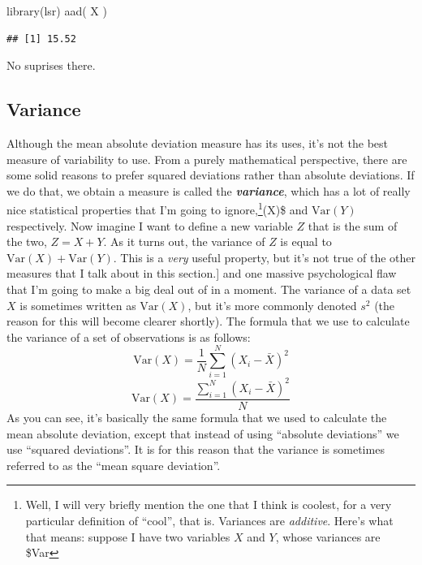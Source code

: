 \documentclass[
]{book}
\newenvironment{Shaded}{\begin{snugshade}}{\end{snugshade}}
\newcommand{\FunctionTok}[1]{\textcolor[rgb]{0.00,0.00,0.00}{#1}}
\newcommand{\NormalTok}[1]{#1}
\begin{document}
\begin{Shaded}
\begin{Highlighting}[]
\FunctionTok{library}\NormalTok{(lsr)}
\FunctionTok{aad}\NormalTok{( X )}
\end{Highlighting}
\end{Shaded}

\begin{verbatim}
## [1] 15.52
\end{verbatim}

No suprises there.

\hypertarget{variance}{%
\subsection{Variance}\label{variance}}

Although the mean absolute deviation measure has its uses, it's not the best measure of variability to use. From a purely mathematical perspective, there are some solid reasons to prefer squared deviations rather than absolute deviations. If we do that, we obtain a measure is called the \textbf{\emph{variance}}, which has a lot of really nice statistical properties that I'm going to ignore,\footnote{Well, I will very briefly mention the one that I think is coolest, for a very particular definition of ``cool'', that is. Variances are \emph{additive}. Here's what that means: suppose I have two variables \(X\) and \(Y\), whose variances are \$\mbox{Var}}(X)\$ and \(\mbox{Var}(Y)\) respectively. Now imagine I want to define a new variable \(Z\) that is the sum of the two, \(Z = X+Y\). As it turns out, the variance of \(Z\) is equal to \(\mbox{Var}(X) + \mbox{Var}(Y)\). This is a \emph{very} useful property, but it's not true of the other measures that I talk about in this section.{]} and one massive psychological flaw that I'm going to make a big deal out of in a moment. The variance of a data set \(X\) is sometimes written as \(\mbox{Var}(X)\), but it's more commonly denoted \(s^2\) (the reason for this will become clearer shortly). The formula that we use to calculate the variance of a set of observations is as follows:
\[
\mbox{Var}(X) = \frac{1}{N} \sum_{i=1}^N \left( X_i - \bar{X} \right)^2
\]
\[\mbox{Var}(X) = \frac{\sum_{i=1}^N \left( X_i - \bar{X} \right)^2}{N}\]
As you can see, it's basically the same formula that we used to calculate the mean absolute deviation, except that instead of using ``absolute deviations'' we use ``squared deviations''. It is for this reason that the variance is sometimes referred to as the ``mean square deviation''.
\end{document}
